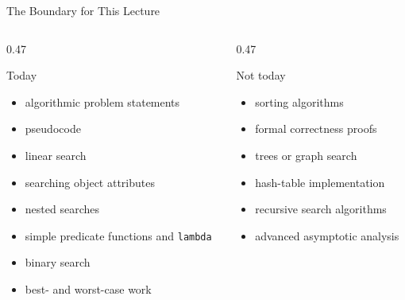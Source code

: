 \documentclass[aspectratio=169,10pt]{beamer}
\begin{document}
\begin{frame}{The Boundary for This Lecture}
  \begin{columns}[T,onlytextwidth]
    \begin{column}{0.47\textwidth}
      \begin{block}{Today}
        \begin{itemize}
          \item algorithmic problem statements
          \item pseudocode
          \item linear search
          \item searching object attributes
          \item nested searches
          \item simple predicate functions and \texttt{lambda}
          \item binary search
          \item best- and worst-case work
        \end{itemize}
      \end{block}
    \end{column}
    \begin{column}{0.47\textwidth}
      \begin{alertblock}{Not today}
        \begin{itemize}
          \item sorting algorithms
          \item formal correctness proofs
          \item trees or graph search
          \item hash-table implementation
          \item recursive search algorithms
          \item advanced asymptotic analysis
        \end{itemize}
      \end{alertblock}
    \end{column}
  \end{columns}
\end{frame}

\end{document}
